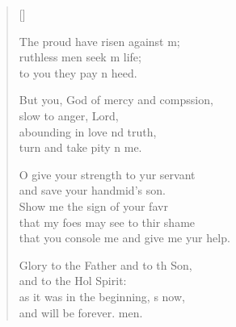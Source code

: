 \begin{verse}[\versewidth]
\begin{patverse}
The proud have risen against m;\Flex\\
ruthless men seek m life;\Med\\
to you they pay n heed.

But you, God of mercy and compssion,\Med\\
slow to anger,  Lord,\\
abounding in love nd truth,\Med\\
turn and take pity n me.

O give your strength to yur servant\Med\\
and save your handmid’s son.\\
Show me the sign of your favr\Flex\\
that my foes may see to thir shame\Med\\
that you console me and give me yur help.

Glory to the Father and to th Son,\Med\\
and to the Hol Spirit:\\
as it was in the beginning, \pointup{\i}s now,\Med\\
and will be forever. men.
  \end{patverse}
\end{verse}
